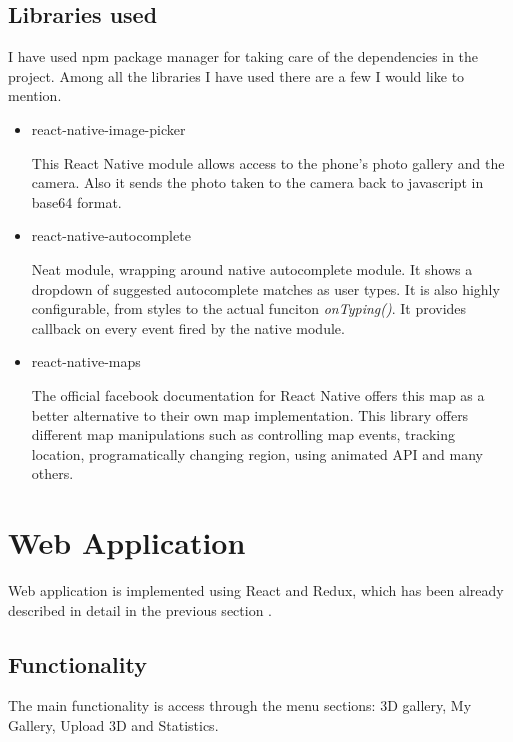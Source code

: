 \documentclass[thesis=M,english]{FITthesis}[2012/10/20]
\begin{document}
\subsection{Libraries used}


I have used npm package manager for taking care of the dependencies in the project. Among all the libraries I have used there are a few I would like to mention.

\begin{itemize}
	\item react-native-image-picker 
	
	This React Native module allows access to the phone's photo gallery and the camera. Also it sends the photo taken to the camera back to javascript in base64 format. \cite{image-picker} \item react-native-autocomplete 
	
	Neat module, wrapping around native autocomplete module. It shows a dropdown of suggested autocomplete matches as user types. It is also highly configurable, from styles to the actual funciton \textit{onTyping()}. It provides callback on every event fired by the native module. \cite{autocomplete}
	
	\item react-native-maps 
	
	The official facebook documentation for React Native offers this map as a better alternative to their own map implementation. This library offers different map manipulations such as controlling map events, tracking location, programatically changing region, using animated API and many others. \cite{maps}
\end{itemize}


\section{Web Application}

Web application is implemented using React and Redux, which has been already described in detail in the previous section .


\subsection{Functionality}

The main functionality is access through the menu sections: 3D gallery, My Gallery, Upload 3D and Statistics.
\end{document}
